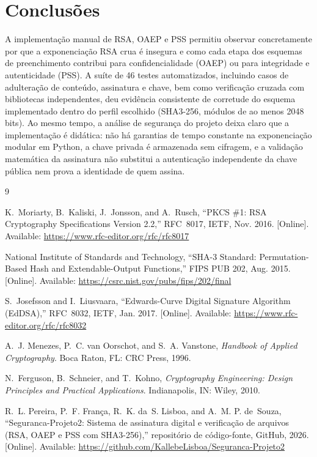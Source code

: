 \documentclass[conference]{IEEEtran}
\begin{document}
\section{Conclusões}

A implementação manual de RSA, OAEP e PSS permitiu observar concretamente por que a
exponenciação RSA crua é insegura e como cada etapa dos esquemas de preenchimento contribui
para confidencialidade (OAEP) ou para integridade e autenticidade (PSS). A suíte de 46 testes
automatizados, incluindo casos de adulteração de conteúdo, assinatura e chave, bem como
verificação cruzada com bibliotecas independentes, deu evidência consistente de corretude do
esquema implementado dentro do perfil escolhido (SHA3-256, módulos de ao menos 2048 bits). Ao
mesmo tempo, a análise de segurança do projeto deixa claro que a implementação é didática: não
há garantias de tempo constante na exponenciação modular em Python, a chave privada é
armazenada sem cifragem, e a validação matemática da assinatura não substitui a autenticação
independente da chave pública nem prova a identidade de quem assina.

\begin{thebibliography}{9}

K.~Moriarty, B.~Kaliski, J.~Jonsson, and A.~Rusch, ``PKCS \#1: RSA Cryptography Specifications
Version 2.2,'' RFC~8017, IETF, Nov. 2016. [Online]. Available: \url{https://www.rfc-editor.org/rfc/rfc8017}

National Institute of Standards and Technology, ``SHA-3 Standard: Permutation-Based Hash and
Extendable-Output Functions,'' FIPS PUB 202, Aug. 2015. [Online]. Available:
\url{https://csrc.nist.gov/pubs/fips/202/final}

S.~Josefsson and I.~Liusvaara, ``Edwards-Curve Digital Signature Algorithm (EdDSA),'' RFC~8032,
IETF, Jan. 2017. [Online]. Available: \url{https://www.rfc-editor.org/rfc/rfc8032}

A.~J. Menezes, P.~C. van Oorschot, and S.~A. Vanstone, \emph{Handbook of Applied Cryptography}.
Boca Raton, FL: CRC Press, 1996.

N.~Ferguson, B.~Schneier, and T.~Kohno, \emph{Cryptography Engineering: Design Principles and
Practical Applications}. Indianapolis, IN: Wiley, 2010.

R.~L. Pereira, P.~F. França, R.~K. da~S. Lisboa, and A.~M. P. de~Souza, ``Seguranca-Projeto2:
Sistema de assinatura digital e verificação de arquivos (RSA, OAEP e PSS com SHA3-256),''
repositório de código-fonte, GitHub, 2026. [Online]. Available:
\url{https://github.com/KallebeLisboa/Seguranca-Projeto2}

\end{thebibliography}
\end{document}
